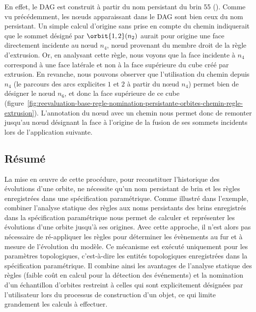 En effet, le DAG est construit à partir du nom persistant du brin 55 (). Comme vu précédemment, les n\oe uds apparaissant dans le DAG sont bien ceux du nom persistant. Un simple calcul d'origine sans prise en compte du chemin indiquerait que le sommet désigné par \(\orbit{1,2}(n_{2})\) aurait pour origine une face directement incidente au n\oe ud \(n_{4}\), n\oe ud provenant du membre droit de la règle d'extrusion. Or, en analysant cette règle, nous voyons que la face incidente à \(n_{4}\) correspond à une face latérale et non à la face supérieure du cube créé par extrusion. En revanche, nous pouvons observer que l'utilisation du chemin depuis \(n_{4}\) (le parcours des arcs explicites \(1\) et \(2\) à partir du n\oe ud \(n_{4}\)) permet bien de désigner le n\oe ud \(n_{6}\), et donc la face supérieure de ce cube (figure~\ref{fig:reevaluation-base-regle-nomination-persistante-orbites-chemin-regle-extrusion}).
L'annotation du n\oe ud avec un chemin nous permet donc de remonter jusqu'au n\oe ud désignant la face à l'origine de la fusion de ses sommets incidents lors de l'application suivante. %


\subsection{Résumé}


La mise en \oe uvre de cette procédure, pour reconstituer l'historique des
évolutions d'une orbite, ne nécessite qu'un nom persistant de brin et les règles
enregistrées dans une spécification paramétrique. %
Comme illustré
dans l'exemple, combiner l'analyse statique des règles aux noms persistants des brins enregistrés dans la spécification paramétrique nous permet de calculer et
représenter les évolutions d'une orbite jusqu'à ses origines. %
Avec cette approche, il n'est alors pas nécessaire de ré-appliquer les règles pour déterminer les évènements au fur et à mesure de l'évolution du modèle. %
Ce mécanisme est exécuté uniquement pour les paramètres topologiques,
c'est-à-dire les entités topologiques enregistrées dans la spécification
paramétrique.%
Il combine ainsi les avantages de
l'analyse statique des règles (faible coût en calcul pour la détection des
événements) et la nomination d'un échantillon d'orbites restreint à celles qui
sont explicitement désignées par l'utilisateur lors du processus de construction d'un objet, ce qui limite grandement les calculs à effectuer.%


